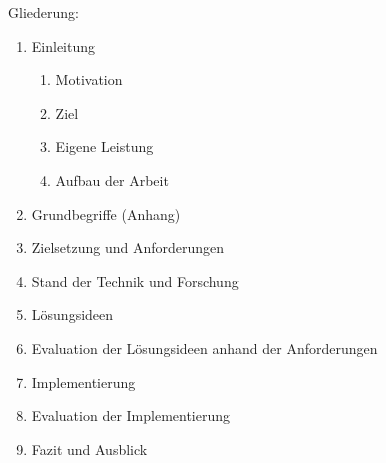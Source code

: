 \begin{flushleft}
    Gliederung:
    \begin{enumerate}
    \item Einleitung
    \begin{enumerate}
        \item Motivation
        \item Ziel
        \item Eigene Leistung
        \item Aufbau der Arbeit
    \end{enumerate}
    \item Grundbegriffe (Anhang)
    \item Zielsetzung und Anforderungen
    \item Stand der Technik und Forschung
    \item Lösungsideen
    \item Evaluation der Lösungsideen anhand der Anforderungen
    \item Implementierung
    \item Evaluation der Implementierung
    \item Fazit und Ausblick
    \end{enumerate}
\end{flushleft}